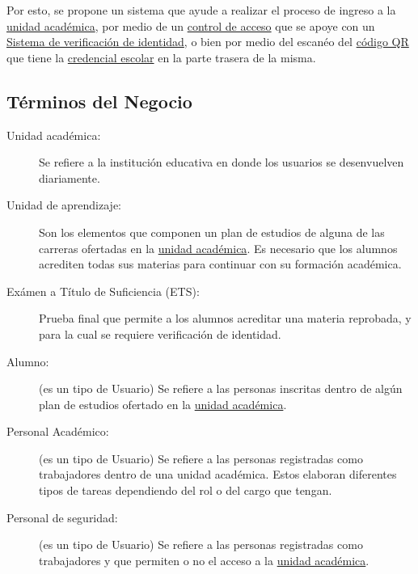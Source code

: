 	Por esto, se propone un sistema que ayude a realizar el proceso de ingreso a la \hyperlink{tUnidadAcademica}{unidad académica}, por medio de un  \hyperlink{tControlAcceso}{control de acceso} que se apoye con un \hyperlink{tSistemaVerificacion}{Sistema de verificación de identidad}, o bien por medio del escanéo del \hyperlink{tCodigoQR}{código QR} que tiene la \hyperlink{tCredencialEscolar}{credencial escolar} en la parte trasera de la misma. 
	
\subsection{Términos del Negocio}
\label{sec:terminosDeNegocio}

\begin{description}
	 \item[\hypertarget{tUnidadAcademica}{Unidad académica:}] Se refiere a la institución educativa en donde los usuarios se desenvuelven diariamente.
	
	\item[\hypertarget{tUnidadAprendizaje}{Unidad de aprendizaje:}] Son los elementos que componen un plan de estudios de alguna de las carreras ofertadas en la \hyperlink{tUnidadAcademica}{unidad académica}. Es necesario que los alumnos acrediten todas sus materias para continuar con su formación académica.
	
	\item[\hypertarget{tETS}{Exámen a Título de Suficiencia (ETS):}] Prueba final que permite a los alumnos acreditar una materia reprobada, y para la cual se requiere verificación de identidad.
	
	\item[\hypertarget{tAlumno}{Alumno:}] (es un tipo de Usuario) Se refiere a las personas inscritas dentro de algún plan de estudios ofertado en la \hyperlink{tUnidadAcademica}{unidad académica}.
	
	\item[\hypertarget{tPersonalAcademico}{Personal Académico:}] (es un tipo de Usuario) Se refiere a las personas registradas como trabajadores dentro de una unidad académica. Estos elaboran diferentes tipos de tareas dependiendo del rol o del cargo que tengan.
	
	\item[\hypertarget{tPersonalSeguridad}{Personal de seguridad:}] (es un tipo de Usuario) Se refiere a las personas registradas como trabajadores y que permiten o no el acceso a la \hyperlink{tUnidadAcademica}{unidad académica}.
	

\end{description}
